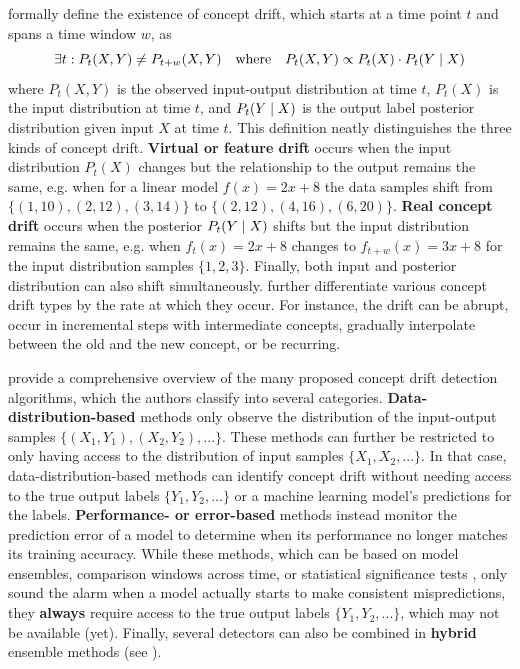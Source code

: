 \newpar \textcite{concept-drift-definition-2019} formally define the existence of concept drift, which starts at a time point $t$ and spans a time window $w$, as
\begin{equation*}
    \exists t \mathrel{:} P_t(X, Y) \neq P_{t+w}(X, Y) \quad \text{where} \quad P_t(X, Y) \propto P_t(X) \cdot P_t(Y \mathrel{|} X)
\end{equation*}
where $P_t(X, Y)$ is the observed input-output distribution at time $t$, $P_t(X)$ is the input distribution at time $t$, and $P_t(Y \mathrel{|} X)$ is the output label posterior distribution given input $X$ at time $t$. This definition neatly distinguishes the three kinds of concept drift. \textbf{Virtual or feature drift} occurs when the input distribution $P_t(X)$ changes but the relationship to the output remains the same, e.g. when for a linear model $f(x) = 2x + 8$ the data samples shift from $\{ (1, 10), (2, 12), (3, 14) \}$ to $\{ (2, 12), (4, 16), (6, 20) \}$. \textbf{Real concept drift} occurs when the posterior $P_t(Y \mathrel{|} X)$ shifts but the input distribution remains the same, e.g. when $f_t(x) = 2x + 8$ changes to $f_{t+w}(x) = 3x + 8$ for the input distribution samples $\{ 1, 2, 3 \}$. Finally, both input and posterior distribution can also shift simultaneously. \textcite{concept-drift-rates-2014} further differentiate various concept drift types by the rate at which they occur. For instance, the drift can be abrupt, occur in incremental steps with intermediate concepts, gradually interpolate between the old and the new concept, or be recurring.

\newpar \textcite{concept-drift-detectors-2022} provide a comprehensive overview of the many proposed concept drift detection algorithms, which the authors classify into several categories. \textbf{Data-distribution-based} methods only observe the distribution of the input-output samples $\{(X_1, Y_1), (X_2, Y_2), ...\}$. These methods can further be restricted to only having access to the distribution of input samples $\{X_1, X_2, ...\}$. In that case, data-distribution-based methods can identify concept drift without needing access to the true output labels $\{Y_1, Y_2, ...\}$ or a machine learning model's predictions for the labels. \textbf{Performance- or error-based} methods instead monitor the prediction error of a model to determine when its performance no longer matches its training accuracy. While these methods, which can be based on model ensembles, comparison windows across time, or statistical significance tests \cite{concept-drift-detectors-2022}, only sound the alarm when a model actually starts to make consistent mispredictions, they \textbf{always} require access to the true output labels $\{Y_1, Y_2, ...\}$, which may not be available (yet). Finally, several detectors can also be combined in \textbf{hybrid} ensemble methods (see ).

